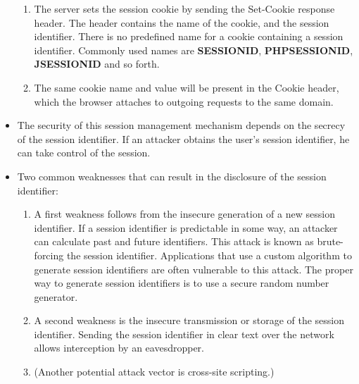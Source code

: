 \documentclass[../main.tex]{subfiles}
\begin{document}
\begin{itemize}
\begin{enumerate}
\item The server sets the session cookie by sending the Set-Cookie response header. The header contains the name of the cookie, and the session identifier. There is no predefined name for a cookie containing a session identifier. Commonly used names are \textbf{SESSIONID}, \textbf{PHPSESSIONID}, \textbf{JSESSIONID} and so forth.
\item The same cookie name and value will be present in the Cookie header, which the browser attaches to outgoing requests to the same domain.
\end{enumerate}
\item The security of this session management mechanism depends on the secrecy of the session identifier. If an attacker obtains the user's session identifier, he can take control of the session.
\item Two common weaknesses that can result in the disclosure of the session identifier:
\begin{enumerate}
\item A first weakness follows from the insecure generation of a new session identifier. If a session identifier is predictable in some way, an attacker can calculate past and future identifiers. This attack is known as brute-forcing the session identifier. Applications that use a custom algorithm to generate session identifiers are often vulnerable to this attack. The proper way to generate session identifiers is to use a secure random number generator.
\item A second weakness is the insecure transmission or storage of the session identifier. Sending the session identifier in clear text over the network allows interception by an eavesdropper.
\item (Another potential attack vector is cross-site scripting.)
\end{enumerate}
\end{itemize}
\end{document}
